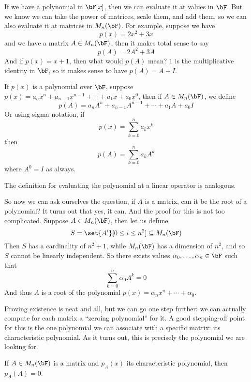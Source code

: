 If we have a polynomial in $\bF[x]$, then we can evaluate it at values in $\bF$.
But we know we can take the power of matrices, scale them, and add them, so we can also evaluate it at matrices in $M_n(\bF)$.
For example, suppose we have
\[ p(x) = 2x^2 + 3x \]
and we have a matrix $A\in M_n(\bF)$, then it makes total sense to say
\[ p(A) = 2A^2 + 3A \]
\newpage
And if $p(x)=x+1$, then what would $p(A)$ mean?
$1$ is the multiplicative identity in $\bF$, so it makes sense to have $p(A)=A+I$.

\begin{defn*}

    If $p(x)$ is a polynomial over $\bF$, suppose $p(x)=a_nx^n+a_{n-1}x^{n-1}+\cdots+a_1x+a_0x^0$, then if $A\in M_n(\bF)$, we define
    \[ p(A) = a_nA^n + a_{n-1}A^{n-1} + \cdots + a_1A + a_0I \]
    Or using sigma notation, if
    \[ p(x) = \sum_{k=0}^n a_kx^k \]
    then
    \[ p(A) = \sum_{k=0}^n a_kA^k \]
    where $A^0=I$ as always.

    The definition for evaluating the polynomial at a linear operator is analogous.

\end{defn*}

So now we can ask ourselves the question, if $A$ is a matrix, can it be the root of a polynomial?
It turns out that yes, it can.
And the proof for this is not too complicated.
Suppose $A\in M_n(\bF)$, then let us defune
\[ S = \set{A^i}[0\leq i\leq n^2] \subseteq M_n(\bF) \]
Then $S$ has a cardinality of $n^2+1$, while $M_n(\bF)$ has a dimension of $n^2$, and so $S$ cannot be linearly independent.
So there exists values $\alpha_0,\dots,\alpha_n\in\bF$ such that
\[ \sum_{k=0}^n \alpha_0 A^k = 0 \]
And thus $A$ is a root of the polynomial $p(x)=\alpha_nx^n+\cdots+\alpha_0$.

Proving existence is neat and all, but we can go one step further: we can actually compute for each matrix a ``zeroing polynomial'' for it.
A good stepping-off point for this is the one polynomial we can associate with a specific matrix: its characteristic polynomial.
As it turns out, this is precisely the polynomial we are looking for.

\begin{thrm*}

    If $A\in M_n(\bF)$ is a matrix and $p_A(x)$ its characteristic polynomial, then $p_A(A)=0$.

\end{thrm*}

